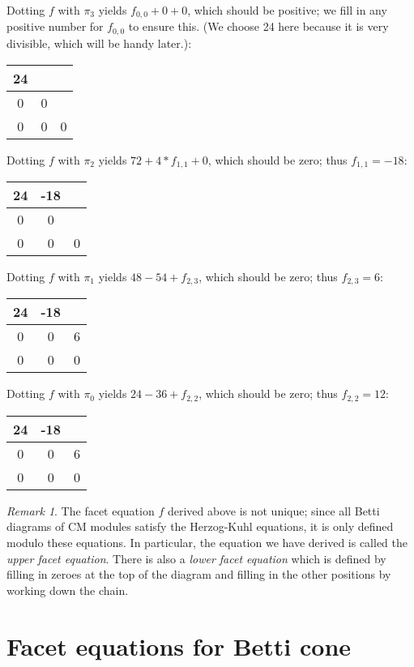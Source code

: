 \documentclass[12pt]{amsart}
\theoremstyle{plain}
\theoremstyle{definition}
\theoremstyle{remark}
\newtheorem{remark}[thm]{Remark}
\begin{document}
Dotting $f$ with $\pi_3$ yields $f_{0,0}+0+0$, which should be
positive; we fill in any positive number for $f_{0,0}$ to ensure
this.  (We choose 24 here because it is very divisible, which will be
handy later.):

\begin{tabular}{|c|c|c|}
\hline
24&&\\
\hline
0&0&\\
\hline
0&0&0\\
\hline
\end{tabular}

Dotting $f$ with $\pi_2$ yields $72+4*f_{1,1}+0$, which should be
zero; thus $f_{1,1}=-18$:


\begin{tabular}{|c|c|c|}
\hline
24&-18&\\
\hline
0&0&\\
\hline
0&0&0\\
\hline
\end{tabular}

Dotting $f$ with $\pi_1$ yields $48-54+f_{2,3}$, which should be zero;
thus $f_{2,3}=6$:


\begin{tabular}{|c|c|c|}
\hline
24&-18&\\
\hline
0&0&6\\
\hline
0&0&0\\
\hline
\end{tabular}

Dotting $f$ with $\pi_0$ yields $24-36+f_{2,2}$, which should be zero;
thus $f_{2,2}=12$:


\begin{tabular}{|c|c|c|}
\hline
24&-18&\\
\hline
0&0&6\\
\hline
0&0&0\\
\hline
\end{tabular}



\begin{remark}
The facet equation $f$ derived above is not unique; since all Betti
diagrams of CM modules satisfy the Herzog-Kuhl equations, it is only
defined modulo these equations.  In particular, the equation we have
derived is called the \emph{upper facet equation}.  There is also a
\emph{lower facet equation} which is defined by filling in zeroes at
the top of the diagram and filling in the other positions by working
down the chain.
\end{remark}






\section{Facet equations for Betti cone}
\end{document}
